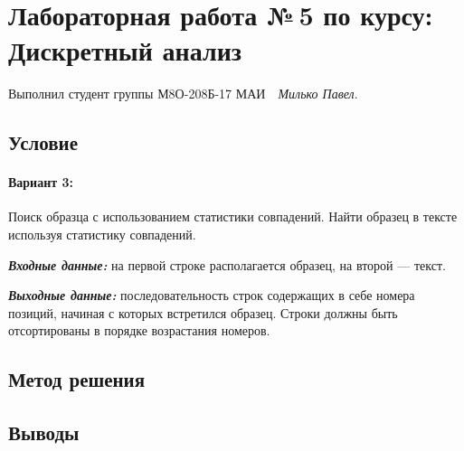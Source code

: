 \documentclass[12pt]{article}
\begin{document}
\section*{\centering Лабораторная работа №\,5 по курсу:\\ Дискретный анализ}

Выполнил студент группы М8О-208Б-17 МАИ \,\, \textit{Милько Павел}.

\subsection*{Условие}
\paragraph*{Вариант 3:} Поиск образца с использованием статистики совпадений.
Найти образец в тексте используя статистику совпадений.

\textbf{\textit{Входные данные:}} на первой строке располагается образец, на второй ---
текст.

\textbf{\textit{Выходные данные:}} последовательность строк содержащих в себе номера
позиций, начиная с которых встретился образец. Строки должны быть
отсортированы в порядке возрастания номеров.

\subsection*{Метод решения}



\subsection*{Выводы}
\end{document}

